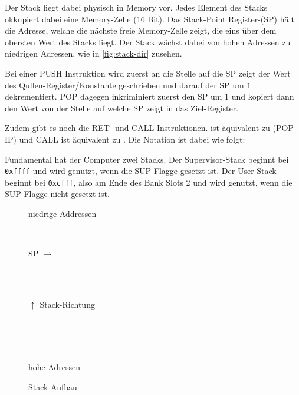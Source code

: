 \documentclass{scrartcl}
\begin{document}

Der Stack liegt dabei physisch in Memory vor. Jedes Element des Stacks okkupiert dabei eine Memory-Zelle (16 Bit). Das Stack-Point Register-(SP) hält die Adresse, welche die nächste freie Memory-Zelle zeigt, die eins über dem obersten Wert des Stacks liegt. Der Stack wächst dabei von hohen Adressen zu niedrigen Adressen, wie in \autoref{fig:stack-dir} zusehen. 

Bei einer PUSH Instruktion wird zuerst an die Stelle auf die SP zeigt der Wert des Qullen-Register/Konstante geschrieben und darauf der SP um $1$ dekrementiert. POP dagegen inkriminiert zuerst den SP um $1$ und kopiert dann den Wert von der Stelle auf welche SP zeigt in das Ziel-Register.

Zudem gibt es noch die RET- und CALL-Instruktionen.  ist äquivalent zu \text(POP IP) und CALL ist äquivalent zu . Die Notation ist dabei wie folgt:



Fundamental hat der Computer zwei Stacks. Der Supervisor-Stack beginnt bei \texttt{0xffff} und wird genutzt, wenn die SUP Flagge gesetzt ist. Der User-Stack beginnt bei \texttt{0xcfff}, also am Ende des Bank Slots 2 und wird genutzt, wenn die SUP Flagge nicht gesetzt ist.

\begin{figure}[h]
	\centering
	\caption{Stack Aufbau}
	\label{fig:stack-dir}

	\begin{bytefield}[leftcurly=., rightcurly=.]{16}
		\begin{rightwordgroup}{\small niedrige Addressen}
		\end{rightwordgroup} \\
		\begin{leftwordgroup}{\small SP $\rightarrow$}
		\end{leftwordgroup} \\
		 \\
		\begin{rightwordgroup}{\small $\uparrow$ Stack-Richtung}
		\end{rightwordgroup} \\
		 \\
		 \\
		\begin{rightwordgroup}{\small hohe Adressen}
		\end{rightwordgroup}
	\end{bytefield}

\end{figure}
\end{document}
